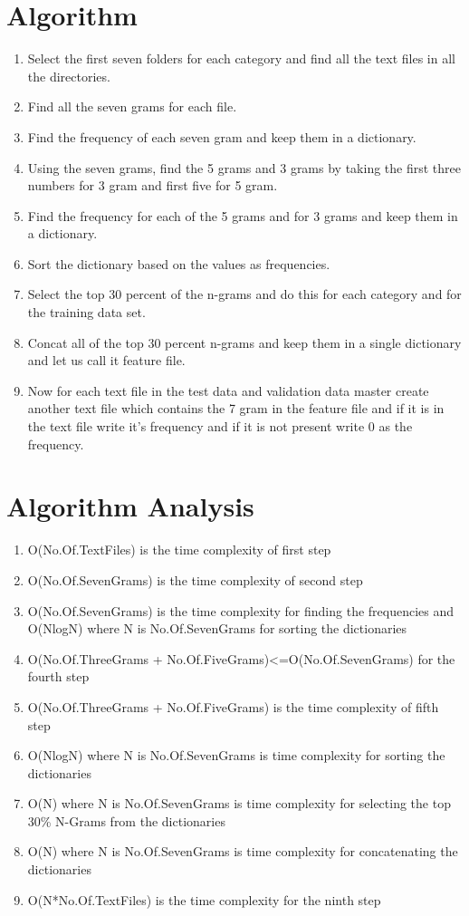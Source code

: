 \documentclass[a4paper,11pt]{article}
\begin{document}
\section{Algorithm}
\begin{enumerate}
\item Select the first seven folders for each category and find all the text files in all the directories.
\item Find all the seven grams for each file.
\item Find the frequency of each seven gram and keep them in a dictionary.
\item Using the seven grams, find the 5 grams and 3 grams by taking the first three numbers for 3 gram and first five for 5 gram.
\item Find the frequency for each of the 5 grams and for 3 grams and keep them in a dictionary.
\item Sort the dictionary based on the values as frequencies.
\item Select the top 30 percent of the n-grams and do this for each category and for the training data set.
\item Concat all of the top 30 percent n-grams and keep them in a single dictionary and let us call it feature file.
\item Now for each text file in the test data and validation data master create another text file which contains the 7 gram in the feature file and if it is in the text file write it's frequency and if it is not present write 0 as the frequency.
\end{enumerate}

\section{Algorithm Analysis} 
\begin{enumerate}
  \item  O(No.Of.TextFiles) is the time complexity of first step 
  \item  O(No.Of.SevenGrams) is the time complexity of second step
  \item  O(No.Of.SevenGrams) is the time complexity for finding the frequencies and O(NlogN) where N is No.Of.SevenGrams for sorting the dictionaries
  \item  O(No.Of.ThreeGrams + No.Of.FiveGrams)\textless=O(No.Of.SevenGrams) for the fourth step
  \item  O(No.Of.ThreeGrams + No.Of.FiveGrams) is the time complexity of fifth step
  \item  O(NlogN) where N is No.Of.SevenGrams is time complexity for sorting the dictionaries 
  \item  O(N) where N is No.Of.SevenGrams is time complexity for selecting the top 30\% N-Grams from the dictionaries
  \item  O(N) where N is No.Of.SevenGrams is time complexity for concatenating the dictionaries
  \item  O(N*No.Of.TextFiles) is the time complexity for the ninth step
\end{enumerate}
\end{document}
